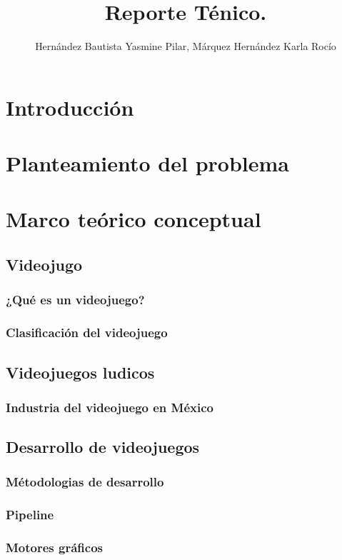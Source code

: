\documentclass[11pt,letterpaper]{article}
\begin{document}
	\author{Hernández Bautista Yasmine Pilar, Márquez 		Hernández Karla Rocío}
	\title{Reporte Ténico.}
	\maketitle
	\tableofcontents
	
	\section{Introducción}
	\section{Planteamiento del problema}
	\section{Marco teórico conceptual}
		\subsection{Videojugo}
			\subsubsection{¿Qué es un videojuego?}
			\subsubsection{Clasificación del videojuego}
			\subsection{Videojuegos ludicos}
			\subsubsection{Industria del videojuego en México}
		\subsection{Desarrollo de videojuegos}
			\subsubsection{Métodologias de desarrollo}
			\subsubsection{Pipeline}			
			\subsubsection{Motores gráficos}
\end{document}
